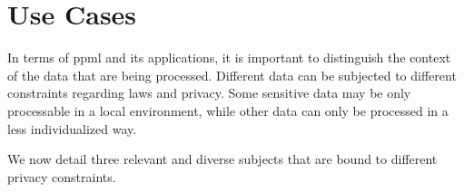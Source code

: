 
\section{Use Cases}
\label{sec:UseCases}


In terms of \ac{ppml} and its applications, it is important to distinguish the context of the data that are being processed. Different data can be subjected to different constraints regarding laws and privacy. Some sensitive data may be only processable in a local environment, while other data can only be processed in a less individualized way.

We now detail three relevant and diverse subjects that are bound to different privacy constraints.

